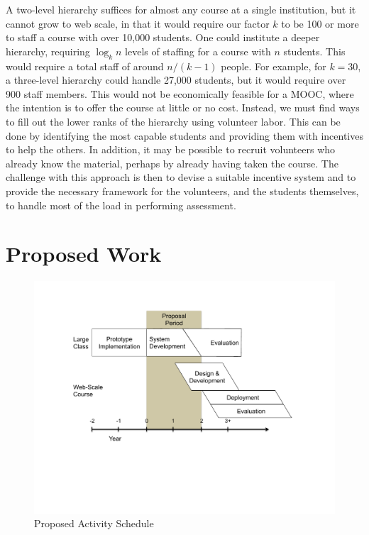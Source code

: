 \documentclass[12pt]{article}
\begin{document}
A two-level hierarchy suffices for almost any course at a single
institution, but it cannot grow to web scale, in that it would require
our factor $k$ to be 100 or more to staff a course with over 10,000
students.  One could institute a deeper hierarchy,
requiring $\log_k n$ levels of staffing for a course with $n$ students.
This would require a
total staff of around $n/(k-1)$ people.  For example, for $k = 30$, a
three-level hierarchy could handle 27,000 students, but it would
require over 900 staff members.  This would not be economically feasible
for a MOOC, where the intention is to offer the course at little or no
cost.  Instead, we must find ways to fill out the lower ranks of the
hierarchy using volunteer labor.  This can be done by identifying the
most capable students and providing them with incentives to help the
others.  In addition, it may be possible to recruit volunteers who
already know the material, perhaps by already having taken the course.
The challenge with this approach is then to devise a suitable
incentive system and to provide the necessary framework for the
volunteers, and the students themselves, to handle most of the load in
performing assessment.

\section{Proposed Work}

\begin{figure}
\begin{center}
\includegraphics[scale=0.7]{schedule}
\end{center}
\caption{Proposed Activity Schedule}
\label{fig:schedule}
\end{figure}
\end{document}
